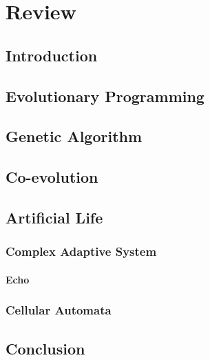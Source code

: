 \chapter{Review}

\section{Introduction}

\section{Evolutionary Programming}

\section{Genetic Algorithm}

\section{Co-evolution}

\section{Artificial Life}

\subsection{Complex Adaptive System}

\subsubsection{Echo}

\subsection{Cellular Automata}

\section{Conclusion}